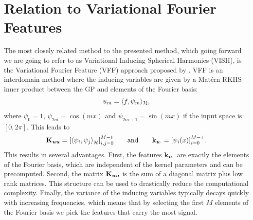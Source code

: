 \section{Relation to Variational Fourier Features}

The most closely related method to the presented method, which going forward we are going to refer to as Variational Inducing Spherical Harmonics (VISH), is the Variational Fourier Feature (VFF) approach proposed by \citet{hensman2017variational}. VFF is an interdomain method where the inducing variables are given by a Mat\'ern RKHS inner product between the GP and elements of the Fourier basis:
\begin{equation}
u_m = \langle f, \psi_m \rangle_{{\mathcal{H}}},
\end{equation}
where $\psi_0 = 1$, $\psi_{2m}=\cos(m x)$ and $\psi_{2m+1}=\sin(m x)$ if the input space is $[0, 2 \pi]$. This leads to
\begin{equation}
    \Kuu = \left[\langle \psi_i , \psi_{j} \rangle_\rkhs^{} \right]_{i, j = 0}^{M-1}\qquad\text{and}\qquad\kux = \left[ \psi_i(x)\right]_{i = 0}^{M-1}\, .
\end{equation}
This results in several advantages. First, the features $\mathbf{k}_{\bm{u} \cdot}$ are exactly the elements of the Fourier basis, which are independent of the kernel parameters and can be precomputed. Second, the matrix $\mathbf{{K}}_{\bm{u} \bm{u}}$ is the sum of a diagonal matrix plus low rank matrices. This structure can be used to drastically reduce the computational complexity. Finally, the variance of the inducing variables typically decays quickly with increasing frequencies, which means that by selecting the first $M$ elements of the Fourier basis we pick the features that carry the most signal.

